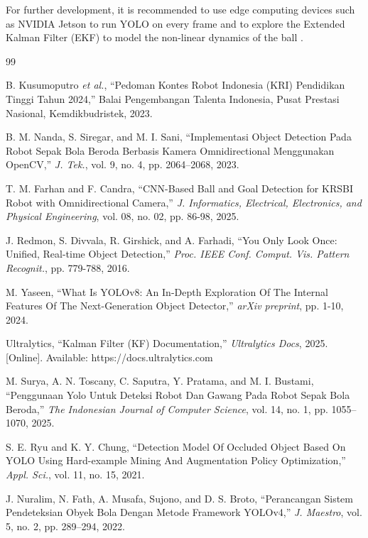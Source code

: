 \documentclass[12pt,a4paper]{article}
\begin{document}
For further development, it is recommended to use edge computing devices such as NVIDIA Jetson to run YOLO on every frame and to explore the Extended Kalman Filter (EKF) to model the non-linear dynamics of the ball \cite{Firdaus2025}.

\begin{thebibliography}{99}

 B. Kusumoputro \textit{et al.}, ``Pedoman Kontes Robot Indonesia (KRI) Pendidikan Tinggi Tahun 2024,'' Balai Pengembangan Talenta Indonesia, Pusat Prestasi Nasional, Kemdikbudristek, 2023.

 B. M. Nanda, S. Siregar, and M. I. Sani, ``Implementasi Object Detection Pada Robot Sepak Bola Beroda Berbasis Kamera Omnidirectional Menggunakan OpenCV,'' \textit{J. Tek.}, vol. 9, no. 4, pp. 2064–2068, 2023.

 T. M. Farhan and F. Candra, ``CNN-Based Ball and Goal Detection for KRSBI Robot with Omnidirectional Camera,'' \textit{J. Informatics, Electrical, Electronics, and Physical Engineering}, vol. 08, no. 02, pp. 86-98, 2025.

 J. Redmon, S. Divvala, R. Girshick, and A. Farhadi, ``You Only Look Once: Unified, Real-time Object Detection,'' \textit{Proc. IEEE Conf. Comput. Vis. Pattern Recognit.}, pp. 779-788, 2016.

 M. Yaseen, ``What Is YOLOv8: An In-Depth Exploration Of The Internal Features Of The Next-Generation Object Detector,'' \textit{arXiv preprint}, pp. 1-10, 2024.

 Ultralytics, ``Kalman Filter (KF) Documentation,'' \textit{Ultralytics Docs}, 2025. [Online]. Available: https://docs.ultralytics.com

 M. Surya, A. N. Toscany, C. Saputra, Y. Pratama, and M. I. Bustami, ``Penggunaan Yolo Untuk Deteksi Robot Dan Gawang Pada Robot Sepak Bola Beroda,'' \textit{The Indonesian Journal of Computer Science}, vol. 14, no. 1, pp. 1055–1070, 2025.

 S. E. Ryu and K. Y. Chung, ``Detection Model Of Occluded Object Based On YOLO Using Hard-example Mining And Augmentation Policy Optimization,'' \textit{Appl. Sci.}, vol. 11, no. 15, 2021.

 J. Nuralim, N. Fath, A. Musafa, Sujono, and D. S. Broto, ``Perancangan Sistem Pendeteksian Obyek Bola Dengan Metode Framework YOLOv4,'' \textit{J. Maestro}, vol. 5, no. 2, pp. 289–294, 2022.


\end{thebibliography}
\end{document}
